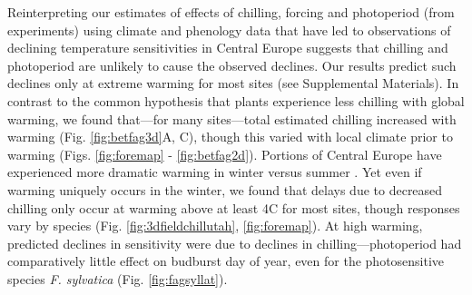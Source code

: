 \documentclass{article}
\newcommand{\R}[1]{\label{#1}\linelabel{#1}}
\begin{document}

\par Reinterpreting our estimates of effects of chilling, forcing and photoperiod (from experiments)\R{ee9} using climate and phenology data that have led to observations of declining temperature sensitivities in Central Europe suggests that chilling and photoperiod are unlikely to cause the observed declines. Our results predict such declines only at extreme warming for most sites (see Supplemental Materials). In contrast to the common hypothesis that plants experience less chilling with global warming, we found that---for many sites---total estimated chilling increased with warming (Fig. \ref{fig:betfag3d}A, C), though this varied with local climate prior to warming (Figs. \ref{fig:foremap} - \ref{fig:betfag2d}). 
Portions of Central Europe have experienced more dramatic warming in winter versus summer \emph{\citep[][]{li2015,balling1998}}. Yet even if warming uniquely occurs in the winter, we found that delays due to decreased chilling only occur at warming above at least 4\degree C for most sites, though responses vary by species (Fig. \ref{fig:3dfieldchillutah}, \ref{fig:foremap}). At high warming, predicted declines in sensitivity were due to declines in chilling---photoperiod had comparatively little effect on budburst day of year, even for the photosensitive species \emph{F. sylvatica} (Fig. \ref{fig:fagsyllat}). 
\end{document}
